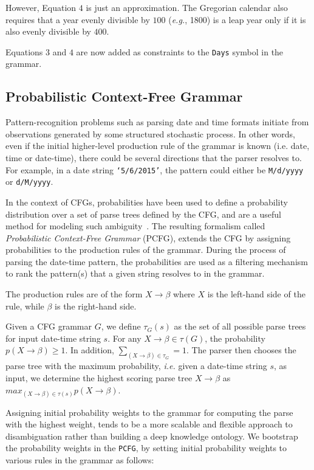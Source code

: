 However, Equation $4$ is just an approximation. The Gregorian calendar also requires that a year evenly divisible by $100$ (\textit{e.g.}, 1800) is a leap year only if it is also evenly divisible by $400$. 

Equations $3$ and $4$ are now added as constraints to the \texttt{Days} symbol in the grammar.

\subsection{Probabilistic Context-Free Grammar}

Pattern-recognition problems such as parsing date and time formats initiate from observations generated by some structured stochastic process. In other words, even if the initial higher-level production rule of the grammar is known (i.e. date, time or date-time), there could be several directions that the parser resolves to. For example, in a date string \texttt{`5/6/2015'}, the pattern could either be \texttt{M/d/yyyy} or \texttt{d/M/yyyy}. 

In the context of CFGs, probabilities have been used to define a probability distribution over a set of parse trees defined by the CFG, and are a useful method for modeling such ambiguity~\cite{Collins:2003,Manning:1999}. The resulting formalism called \textit{Probabilistic Context-Free Grammar} (PCFG), extends the CFG by assigning probabilities to the production rules of the grammar. During the process of parsing the date-time pattern, the probabilities are used as a filtering mechanism to rank the pattern(s) that a given string resolves to in the grammar. 

The production rules are of the form $ X \rightarrow \beta$ where $X$ is the left-hand side of the rule, while $\beta$ is the right-hand side.

Given a CFG grammar $G$, we define  $\tau_G(s)$ as the set of all possible parse trees for input date-time string $s$.  For any $X \rightarrow \beta \in \tau(G)$, the probability $p(X \rightarrow \beta) \ge 1$. In addition, $\sum_{(X \rightarrow \beta) \in \tau_{G}} = 1$. The parser then chooses the parse tree with the maximum probability, \textit{i.e.} given a date-time string $s$, as input, we determine the highest scoring parse tree $X \rightarrow \beta$ as  $max_{(X \rightarrow \beta) \in \tau(s)} p(X \rightarrow \beta)$.


Assigning initial probability weights to the grammar for computing the parse with the highest weight, tends to be a more scalable and flexible approach to disambiguation rather than building a deep knowledge ontology. We bootstrap the probability weights in the \texttt{PCFG}, by setting initial probability weights to various rules in the grammar as follows:

